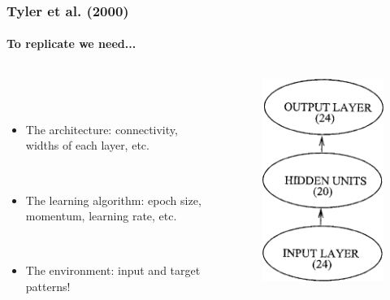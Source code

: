\documentclass{beamer}
\newcommand{\figheight}{0.72\textheight}
\begin{document}
\begin{frame}[fragile]
\frametitle{Tyler et al. (2000)}
\framesubtitle{To replicate we need...}
 \begin{columns}[T]
    \begin{column}{.45\textwidth} 
             \  \\
 \   \\   
     
     
\begin{itemize}[<+->]
\item The architecture: connectivity, widths of each layer, etc.

\ \\

 
\item The learning algorithm: epoch size, momentum, learning rate, etc.

\ \\

 
 \item The environment: input and target patterns!
\end{itemize}
\end{column}
\begin{column}{.55\textwidth}
\begin{figure}[t]
 \begin{flushleft}

 \includegraphics[height = \figheight]{./fig/tyler00.png}


 \end{flushleft}
\end{figure}
\end{column}

\end{columns}
\end{frame}
\end{document}
